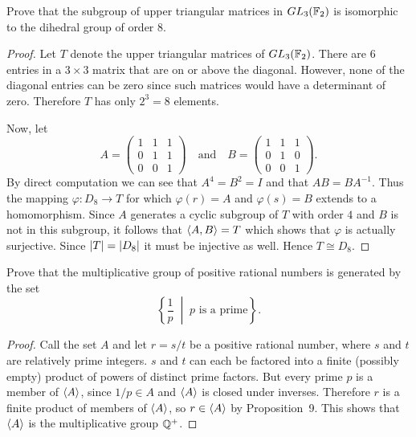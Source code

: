  Prove that the subgroup of upper triangular matrices in
$GL_3(\mathbb{F}_2)$ is isomorphic to the dihedral group of order $8$.
\begin{proof}
  Let $T$ denote the upper triangular matrices of $GL_3(\mathbb{F}_2)$. There
  are $6$ entries in a $3\times3$ matrix that are on or above the
  diagonal. However, none of the diagonal entries can be zero since
  such matrices would have a determinant of zero. Therefore $T$ has
  only $2^3 = 8$ elements.

  Now, let
  \begin{equation*}
    A =
    \begin{pmatrix}
      1 & 1 & 1 \\
      0 & 1 & 1 \\
      0 & 0 & 1
    \end{pmatrix}
    \quad\text{and}\quad
    B =
    \begin{pmatrix}
      1 & 1 & 1 \\
      0 & 1 & 0 \\
      0 & 0 & 1
    \end{pmatrix}.
  \end{equation*}
  By direct computation we can see that $A^4 = B^2 = I$ and that
  $AB = BA^{-1}$. Thus the mapping $\varphi\colon D_8\to T$ for which
  $\varphi(r) = A$ and $\varphi(s) = B$ extends to a
  homomorphism. Since $A$ generates a cyclic subgroup of $T$ with
  order $4$ and $B$ is not in this subgroup, it follows that
  $\langle{A,B}\rangle = T$ which shows that $\varphi$ is actually
  surjective. Since $\lvert{T}\rvert = \lvert{D_8}\rvert$ it must be injective as
  well. Hence $T\cong D_8$.
\end{proof}

 Prove that the multiplicative group of positive rational
numbers is generated by the set
\begin{equation*}
  \left\{\frac1p \;\middle|\; \text{$p$ is a prime}\right\}.
\end{equation*}
\begin{proof}
  Call the set $A$ and let $r = s/t$ be a positive rational number,
  where $s$ and $t$ are relatively prime integers. $s$ and $t$ can
  each be factored into a finite (possibly empty) product of powers of
  distinct prime factors. But every prime $p$ is a member of
  $\langle{A}\rangle$, since $1/p\in A$ and $\langle{A}\rangle$ is closed under
  inverses. Therefore $r$ is a finite product of members of $\langle{A}\rangle$,
  so $r\in\langle{A}\rangle$ by Proposition~9. This shows that $\langle{A}\rangle$ is the
  multiplicative group $\mathbb{Q}^+$.
\end{proof}

